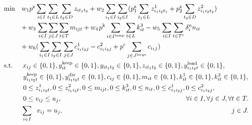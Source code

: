 \begin{center}
\begin{align}
&\textrm{min} \hspace{1.0em} {w_1 p^{\rm{z}} \sum_{i \in I} \sum_{t_1 \in L}  \sum_{t_2 \in D} {z_{it_1t_2}}}
+ {w_2 \sum_{i_1 \in I} \sum_{i_2 \in I} ( p_1^{\rm{z}} \sum_{t_1 \in L} {z_{i_1i_2t_1}^1} + p_2^{\rm{z}} \sum_{t_2 \in D} {z_{i_1i_2t_2}^2} )} \notag \\
&\hspace{2.45em} + {w_3 \hspace{0.1em} \sum_{i \in I} \sum_{j\in J} \sum_{t \in T}  {m_{ijt}}}
+ {w_4 \hspace{0.1em} p^{\rm{k}} \sum_{i \in I^{\rm{lamp}}} \sum_{t \in L} {k_{it}^3}}
- {w_5 \hspace{0.1em} \sum_{i \in I} \sum_{t \in T^{\rm{c}}} \delta_i^{\rm{n}} {n_{it}}} \notag \\
&\hspace{2.45em} + {w_6 ( \hspace{0.1em} \sum_{i_1\in I} \sum_{i_2\in I} \hspace{0.1em} \sum_{j \in J} {c_{i_1i_2j}^1} - {c_{i_1i_2j}^2} + p^{\rm{c}} \sum_{j \in J^{\rm{large}}} {c_{i_1j}} )} \\
&\textrm{s.t.} \hspace{1.5em} x_{ij} \in \{ 0 , 1 \}, {y_{it}^{\rm{keep}}} \in \{ 0 , 1 \}, {y_{it_1t_2}} \in \{ 0 , 1 \}, z_{it_1t_2} \in \{ 0 , 1 \},  {y_{i_1i_2t}^{\rm{load}}} \in \{ 0 , 1 \}, \notag \\
&\hspace{2.9em}  {y_{i_1i_2t}^{\rm{keep}}} \in \{ 0 , 1 \}, {y_{i_1i_2t}^{\rm{dis}}} \in \{ 0 , 1 \}, c_{ij} \in \{ 0 , 1 \}, {m_{it}} \in \{ 0 , 1 \}, {k^1_{it}} \in \{ 0 , 1 \}, {k^2_{it}} \in \{ 0 , 1 \}, \notag \\
&\hspace{2.9em} 0 \leq z_{i_1i_2t}^1, 0 \leq z_{i_1i_2t}^2, 0 \leq m_{ijt}, 0 \leq k^3_{it}, 0 \leq n_{it}, 0 \leq c^1_{i_1i_2j}, 0 \leq c^2_{i_1i_2j}, \notag \\
&\hspace{2.9em} 0 \leq v_{ij} \leq u_j, \hspace{18.7em} \forall i \in I, \forall j \in J, \forall t \in T. \\
&\hspace{2.6em} \sum_{i \in I} {\hspace{0.6em}v_{ij}} = u_j, \hspace{25.33em} j \in J. \\

\end{align}
\end{center}
